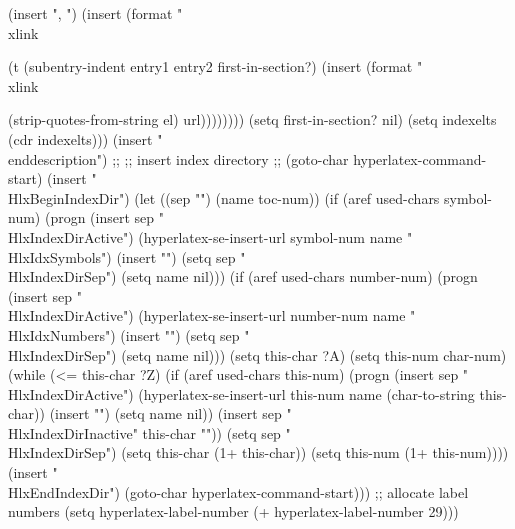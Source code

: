 \begin{ifhtml}
{                       (insert ", \n")
                       (insert (format "\\xlink{%
                      (t (subentry-indent entry1 entry2 first-in-section?)
                         (insert (format "\\xlink{%
                                         (strip-quotes-from-string el)
                                         url))))))))
        (setq first-in-section? nil)
        (setq indexelts (cdr indexelts)))
      (insert "\\end{description}\n")
      ;;
      ;; insert index directory
      ;;
      (goto-char hyperlatex-command-start)
      (insert "\\HlxBeginIndexDir{}")
      (let ((sep "")
            (name toc-num))
        (if (aref used-chars symbol-num)
            (progn
              (insert sep "\\HlxIndexDirActive{")
              (hyperlatex-se-insert-url symbol-num name "\\HlxIdxSymbols")
              (insert "}")
              (setq sep "\\HlxIndexDirSep{}")
              (setq name nil)))
        (if (aref used-chars number-num)
            (progn
              (insert sep "\\HlxIndexDirActive{")
              (hyperlatex-se-insert-url number-num name "\\HlxIdxNumbers")
              (insert "}")
              (setq sep "\\HlxIndexDirSep{}")
              (setq name nil)))
        (setq this-char ?A)
        (setq this-num char-num)
        (while (<= this-char ?Z)
          (if (aref used-chars this-num)
              (progn
                (insert sep "\\HlxIndexDirActive{")
                (hyperlatex-se-insert-url this-num name
                                          (char-to-string this-char))
                (insert "}")
                (setq name nil))
            (insert sep "\\HlxIndexDirInactive{" this-char "}"))
          (setq sep "\\HlxIndexDirSep{}")
          (setq this-char (1+ this-char))
          (setq this-num (1+ this-num))))
      (insert "\\HlxEndIndexDir{}\n")
      (goto-char hyperlatex-command-start)))
  ;; allocate label numbers
  (setq hyperlatex-label-number (+ hyperlatex-label-number 29)))

}}}
\end{ifhtml}
